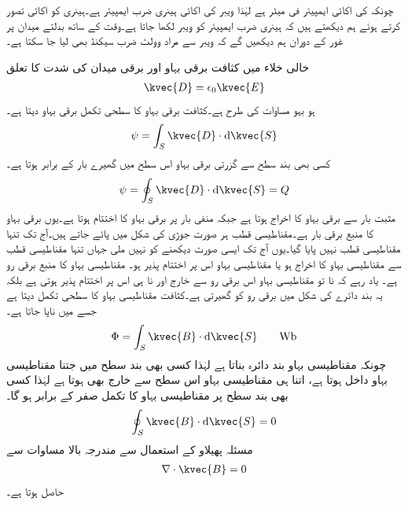 چونکہ  کی اکائی ایمپیئر فی میٹر ہے لہٰذا ویبر کی اکائی ہینری ضرب ایمپیئر ہے۔ہینری کو اکائی تصور کرتے ہوئے ہم دیکھتے ہیں کہ ہینری ضرب ایمپیئر کو ویبر لکھا جاتا ہے۔وقت کے ساتھ بدلتے میدان پر غور کے دوران ہم دیکھیں گے کہ ویبر سے مراد وولٹ ضرب سیکنڈ بھی لیا جا سکتا ہے۔ 

خالی خلاء میں کثافت برقی بہاو  اور برقی میدان کی شدت  کا تعلق
\begin{align*}
\kvec{D}=\epsilon_0 \kvec{E}
\end{align*}
ہو بہو مساوات  کی طرح ہے۔کثافت برقی بہاو کا سطحی تکمل برقی بہاو  دیتا ہے۔
\begin{align*}
\psi=\int_S \kvec{D} \cdot \dif \kvec{S}
\end{align*}
کسی بھی بند سطح سے گزرتی برقی بہاو اس سطح میں گھیرے بار  کے برابر ہوتا ہے۔
\begin{align*}
\psi=\oint_S \kvec{D} \cdot \dif \kvec{S}=Q
\end{align*}
مثبت بار سے برقی بہاو کا اخراج ہوتا ہے جبکہ منفی بار پر برقی بہاو کا اختتام ہوتا ہے۔یوں برقی بہاو کا منبع برقی بار ہے۔مقناطیسی قطب ہر صورت جوڑی کی شکل میں پائے جاتے ہیں۔آج تک تنہا مقناطیسی قطب نہیں پایا گیا۔یوں آج تک ایسی صورت دیکھنے کو نہیں ملی جہاں تنہا مقناطیسی قطب سے مقناطیسی بہاو کا اخراج ہو یا مقناطیسی بہاو اس پر اختتام پذیر ہو۔ مقناطیسی بہاو کا منبع برقی رو ہے۔ یاد رہے کہ نا تو مقناطیسی بہاو اس برقی رو سے خارج اور نا ہی اس پر اختتام پذیر ہوتی ہے بلکہ یہ بند دائرے کی شکل میں برقی رو کو گھیرتی ہے۔کثافت مقناطیسی بہاو کا سطحی تکمل   دیتا ہے جسے   میں ناپا جاتا ہے۔
\begin{align}
\Phi=\int_S \kvec{B} \cdot \dif \kvec{S} \quad \quad \si{\weber}
\end{align} 
چونکہ مقناطیسی بہاو بند دائرہ بناتا ہے لہٰذا کسی بھی بند سطح میں جتنا مقناطیسی بہاو داخل ہوتا ہے، اتنا ہی مقناطیسی بہاو اس سطح سے خارج بھی ہوتا ہے لہٰذا کسی بھی بند سطح پر مقناطیسی بہاو کا تکمل صفر کے برابر ہو گا۔
\begin{align}\label{مساوات_مقناطیسی_مقناطیسی_بہاو_بند_سطح}
\oint_S \kvec{B} \cdot \dif \kvec{S}=0
\end{align}
مسئلہ پھیلاو کے استعمال سے مندرجہ بالا مساوات سے
\begin{align}\label{مساوات_مقناطیسی_مقناطیسی_بہاو_پھیلاو}
\nabla \cdot \kvec{B}=0
\end{align}
حاصل ہوتا ہے۔

